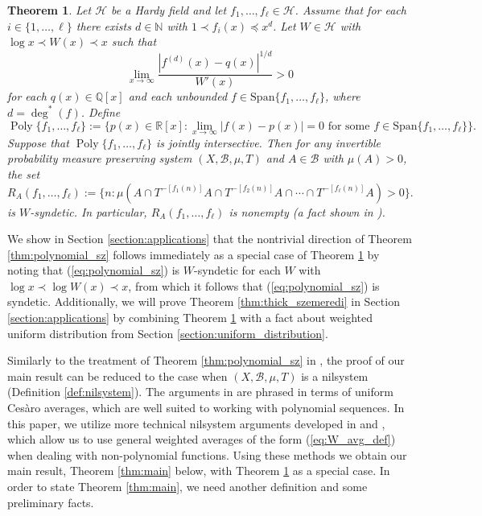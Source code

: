 \documentclass[12pt]{article}
\theoremstyle{plain} %
\newtheorem{theorem}{Theorem}[section]
\theoremstyle{definition} %
\theoremstyle{plain}
\theoremstyle{plain}
\numberwithin{equation}{section}
\newcommand{\Cesaro}{Ces\`{a}ro }
\newcommand{\N}{\mathbb{N}}
\newcommand{\R}{\mathbb{R}}
\newcommand{\Q}{\mathbb{Q}}
\newcommand{\1}{\mathbbm{1}}
\newcommand{\Poly}{\operatorname{Poly}}
\newcommand{\oo}{\infty}
\begin{document}
\begin{theorem}\label{thm:general_thick_szemeredi}
    Let $\mathcal{H}$ be a Hardy field and let $f_1,\dots, f_{\ell}\in \mathcal{H}$. Assume that for each $i\in \{1,\dots, \ell\}$ there exists $d\in \N$ with $1\prec f_i(x)\preceq x^{d}$. Let $W\in \mathcal{H}$ with $\log x\prec  W(x)\prec x$ such that 
    \begin{equation}
    \lim_{x\to\oo}\frac{|f^{(d)}(x)-q(x)|^{1/d}}{W'(x)}>0
    \end{equation}
    for each $q(x)\in \Q[x]$ and each unbounded $f\in \text{Span}\{f_1,\dots, f_{\ell}\}$, where $d = \deg^*(f)$. Define 
    \begin{equation}\label{eq:poly_def}
         \Poly\{f_1,\dots, f_{\ell}\} := \{p(x)\in \R[x]:\lim_{x\to\oo}|f(x)-p(x)|= 0\text{ for some } f\in  \text{Span}\{f_1,\dots, f_{\ell}\}\}.
\end{equation}
Suppose that $\Poly\{f_1,\dots, f_{\ell}\}$ is jointly intersective. Then for any invertible probability measure preserving system $(X,\mathscr{B},\mu,T)$ and $A\in \mathscr{B}$ with $\mu(A)>0$, the set 
\begin{equation}\label{eq:general_Hardy_sz_returns}
    R_A(f_1,\dots, f_{\ell}):=\{n:\mu(A\cap T^{-[ f_1(n)]}A\cap T^{-[ f_2(n)]}A\cap \cdots\cap T^{-[ f_{\ell}(n)]}A )>0\}.
\end{equation}
is $W$-syndetic. In particular, $R_A(f_1,\dots, f_{\ell})$ is nonempty (a fact shown in \cite{BMR24}).
\end{theorem}

We show in Section \ref{section:applications} that the nontrivial direction of Theorem \ref{thm:polynomial_sz} follows immediately as a special case of Theorem \ref{thm:general_thick_szemeredi} by noting that (\ref{eq:polynomial_sz}) is $W$-syndetic for each $W$ with $\log x\prec \log W(x)\prec x$, from which it follows that (\ref{eq:polynomial_sz}) is syndetic. Additionally, we will prove Theorem \ref{thm:thick_szemeredi} in Section \ref{section:applications} by combining Theorem \ref{thm:general_thick_szemeredi} with a fact about weighted uniform distribution from Section \ref{section:uniform_distribution}.




Similarly to the treatment of Theorem \ref{thm:polynomial_sz} in \cite{BLL08}, the proof of our main result can be reduced to the case when $(X,\mathscr{B},\mu,T)$ is a nilsystem (Definition \ref{def:nilsystem}). The arguments in \cite{BLL08} are phrased in terms of uniform \Cesaro averages, which are well suited to working with polynomial sequences. In this paper, we utilize more technical nilsystem arguments developed in \cite{Richter23} and \cite{BMR24}, which allow us to use general weighted averages of the form (\ref{eq:W_avg_def}) when dealing with non-polynomial functions. Using these methods we obtain our main result, Theorem \ref{thm:main} below, with Theorem \ref{thm:general_thick_szemeredi} as a special case. In order to state Theorem \ref{thm:main}, we need another definition and some preliminary facts.
\end{document}

